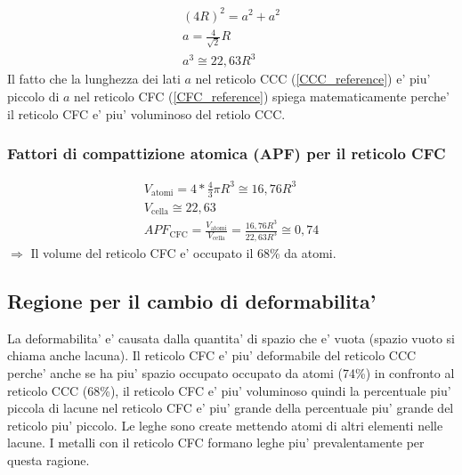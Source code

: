 \documentclass{article}
\begin{document}
                \begin{gather}
                    (4R)^2 = a^2 + a^2 \\
                    a = \frac{4}{\sqrt{2}} R \label{CFC_reference}\\
                    a^3 \cong 22,63 R^3
                \end{gather}
                Il fatto che la lunghezza dei lati $a$ nel reticolo CCC (\ref{CCC_reference}) e' piu' piccolo di $a$ nel reticolo CFC 
                (\ref{CFC_reference}) spiega matematicamente perche' il reticolo CFC e' piu' voluminoso del retiolo CCC.
            \subsubsection{Fattori di compattizione atomica (APF) per il reticolo CFC}
                \begin{gather}
                    V_\text{atomi} = 4 * \frac{4}{3} \pi  R^3 \cong 16,76 R^3 \\
                    V_\text{cella} \cong 22,63 \\
                    APF_\text{CFC} = \frac{V_\text{atomi}}{V_\text{cella}} = \frac{16,76 R^3}{22,63 R^3} \cong 0,74
                \end{gather}
                $\Longrightarrow$ Il volume del reticolo CFC e' occupato il 68\% da atomi.

            \subsection{Regione per il cambio di deformabilita'}
                La deformabilita' e' causata dalla quantita' di spazio che e' vuota (spazio vuoto si chiama anche lacuna).
                Il reticolo CFC e' piu' deformabile del reticolo CCC perche' anche se ha piu' spazio occupato occupato da atomi (74\%) in confronto al reticolo CCC (68\%), 
                il reticolo CFC e' piu' voluminoso quindi la percentuale piu' piccola di lacune nel reticolo CFC e' piu' grande della percentuale piu' grande del reticolo piu' piccolo.
                Le leghe sono create mettendo atomi di altri elementi nelle lacune. I metalli con il reticolo CFC formano leghe piu' prevalentamente per questa ragione.
\end{document}
